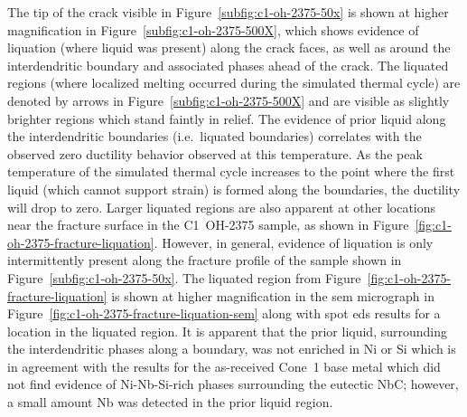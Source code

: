 {The tip of the crack visible in Figure~\ref{subfig:c1-oh-2375-50x} is shown at higher magnification in Figure~\ref{subfig:c1-oh-2375-500X}, which shows evidence of liquation (where liquid was present) along the crack faces, as well as around the interdendritic boundary and associated phases ahead of the crack. The liquated regions (where localized melting occurred during the simulated thermal cycle) are denoted by arrows in Figure~\ref{subfig:c1-oh-2375-500X} and are visible as slightly brighter regions which stand faintly in relief. The evidence of prior liquid along the interdendritic boundaries (i.e.~liquated boundaries) correlates with the observed zero ductility behavior observed at this temperature. As the peak temperature of the simulated thermal cycle increases to the point where the first liquid (which cannot support strain) is formed along the boundaries, the ductility will drop to zero. Larger liquated regions are also apparent at other locations near the fracture surface in the C1~OH-2375 sample, as shown in Figure~\ref{fig:c1-oh-2375-fracture-liquation}. However, in general, evidence of liquation is only intermittently present along the fracture profile of the sample shown in Figure~\ref{subfig:c1-oh-2375-50x}. The liquated region from Figure~\ref{fig:c1-oh-2375-fracture-liquation} is shown at higher magnification in the \gls{sem} micrograph in Figure~\ref{fig:c1-oh-2375-fracture-liquation-sem} along with spot \gls{eds} results for a location in the liquated region. It is apparent that the prior liquid, surrounding the interdendritic phases along a boundary, was not enriched in Ni or Si which is in agreement with the results for the as-received Cone~1 base metal which did not find evidence of Ni-Nb-Si-rich phases surrounding the eutectic NbC; however, a small amount Nb was detected in the prior liquid region.

}
